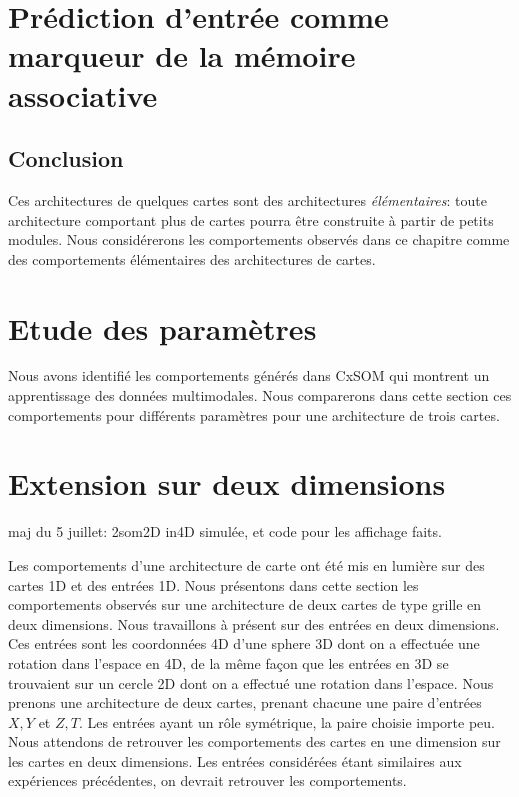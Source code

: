 \documentclass[../main]{subfiles}
\begin{document}
\section{Prédiction d'entrée comme marqueur de la mémoire associative}


\subsection{Conclusion}

Ces architectures de quelques cartes sont des architectures \emph{élémentaires}: toute architecture comportant plus de cartes pourra être construite à partir de petits modules. Nous considérerons les comportements observés dans ce chapitre comme des comportements élémentaires des architectures de cartes.

\section{Etude des paramètres}
Nous avons identifié les comportements générés dans CxSOM qui montrent un apprentissage des données multimodales. Nous comparerons dans cette section ces comportements pour différents paramètres pour une architecture de trois cartes.


\section{Extension sur deux dimensions}

maj du 5 juillet:
2som2D in4D simulée, et code pour les affichage faits.

Les comportements d'une architecture de carte ont été mis en lumière sur des cartes 1D et des entrées 1D. Nous présentons dans cette section les comportements observés sur une architecture de deux cartes de type grille en deux dimensions. 
Nous travaillons à présent sur des entrées en deux dimensions. Ces entrées sont les coordonnées 4D d'une sphere 3D dont on a effectuée une rotation dans l'espace en 4D, de la même façon que les entrées en 3D se trouvaient sur un cercle 2D dont on a effectué une rotation dans l'espace.
Nous prenons une architecture de deux cartes, prenant chacune une paire d'entrées $X,Y$ et $Z,T$. Les entrées ayant un rôle symétrique, la paire choisie importe peu.
Nous attendons de retrouver les comportements des cartes en une dimension sur les cartes en deux dimensions. Les entrées considérées étant similaires aux expériences précédentes, on devrait retrouver les comportements.
\end{document}
